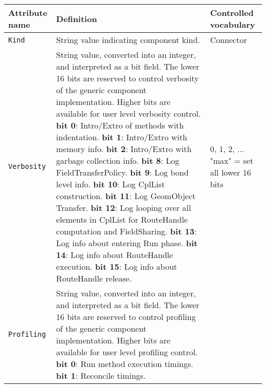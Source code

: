 \begin{longtable}{|p{}|p{}|p{}|}
     \hline\hline
     {\bf Attribute name} & {\bf Definition} & {\bf Controlled vocabulary}\\
     \hline\hline
     {\tt Kind} & String value indicating component kind.& Connector\\ \hline
     {\tt Verbosity} & String value, converted into an integer, and interpreted as a bit field. The lower 16 bits are reserved to control verbosity of the generic component implementation. Higher bits are available for user level verbosity control. \newline
                       {\bf bit 0}: Intro/Extro of methods with indentation.\newline
                       {\bf bit 1}: Intro/Extro with memory info.\newline
                       {\bf bit 2}: Intro/Extro with garbage collection info.\newline
                       {\bf bit 8}: Log FieldTransferPolicy.\newline
                       {\bf bit 9}: Log bond level info.\newline
                       {\bf bit 10}: Log CplList construction.\newline
                       {\bf bit 11}: Log GeomObject Transfer.\newline
                       {\bf bit 12}: Log looping over all elements in CplList for RouteHandle computation and FieldSharing.\newline
                       {\bf bit 13}: Log info about entering Run phase.\newline
                       {\bf bit 14}: Log info about RouteHandle execution.\newline
                       {\bf bit 15}: Log info about RouteHandle release.
                     & 0, 1, 2, ... \newline
                       "max" = set all lower 16 bits\\ \hline
     {\tt Profiling} & String value, converted into an integer, and interpreted as a bit field. The lower 16 bits are reserved to control profiling of the generic component implementation. Higher bits are available for user level profiling control. \newline
                       {\bf bit 0}: Run method execution timings.\newline
                       {\bf bit 1}: Reconcile timings.

\end{longtable}
